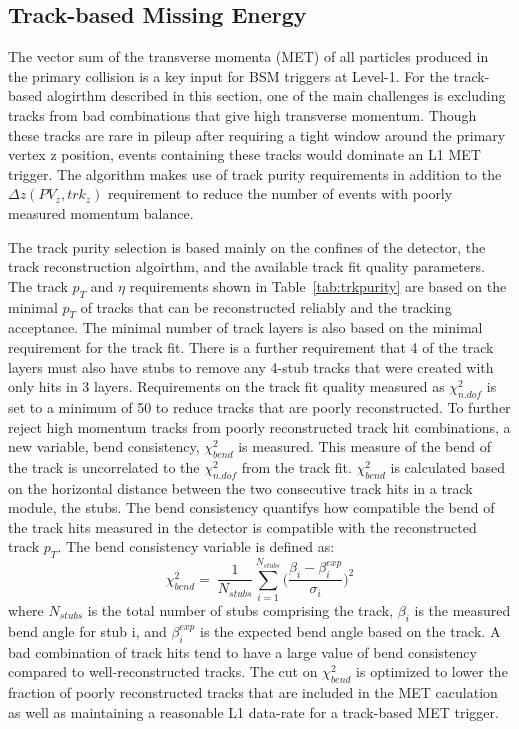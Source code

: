 \subsection{Track-based Missing Energy}
\label{sec:TkMET}

The vector sum of the transverse momenta (MET) of all particles produced in the primary collision is a key input for BSM triggers at Level-1. For the track-based alogirthm described in this section, one of the main challenges is excluding tracks from bad combinations that give high transverse momentum. Though these tracks are rare in pileup after requiring a tight window around the primary vertex z position, events containing these tracks would dominate an L1 MET trigger. The algorithm makes use of track purity requirements in addition to the $\Delta z\left(PV_{z}, trk_{z}\right)$ requirement to reduce the number of events with poorly measured momentum balance.

The track purity selection is based mainly on the confines of the detector, the track reconstruction algoirthm, and the available track fit quality parameters. The track $p_{T}$ and $\eta$ requirements shown in Table~\ref{tab:trkpurity} are based on the minimal $p_{T}$ of tracks that can be reconstructed reliably and the tracking acceptance. The minimal number of track layers is also based on the minimal requirement for the track fit. There is a further requirement that 4 of the track layers must also have stubs to remove any 4-stub tracks that were created with only hits in 3 layers. Requirements on the track fit quality measured as $\chi^{2}_{n.dof}$ is set to a minimum of 50 to reduce tracks that are poorly reconstructed. To further reject high momentum tracks from poorly reconstructed track hit combinations, a new variable, bend consistency, $\chi^{2}_{bend}$ is measured. This measure of the bend of the track is uncorrelated to the $\chi^{2}_{n.dof}$ from the track fit. $\chi^{2}_{bend}$ is calculated based on the horizontal distance between the two consecutive track hits in a track module, the stubs. The bend consistency quantifys how compatible the bend of the track hits measured in the detector is compatible with the reconstructed track $p_{T}$. The bend consistency variable is defined as:
\begin{equation}
\chi^{2}_{bend} =~ \frac{1}{N_{stubs}} \sum_{i=1}^{N_{stubs}}\Big(\frac{\beta_i - \beta_i^{exp}}{\sigma_{i}}\Big)^2
\end{equation}
where $N_{stubs}$ is the total number of stubs comprising the track, $\beta_{i}$ is the measured bend angle for stub i, and $\beta_i^{exp}$ is the expected bend angle based on the track. A bad combination of track hits tend to have a large value of bend consistency compared to well-reconstructed tracks. The cut on $\chi^{2}_{bend}$ is optimized to lower the fraction of poorly reconstructed tracks that are included in the MET caculation as well as maintaining a reasonable L1 data-rate for a track-based MET trigger.



